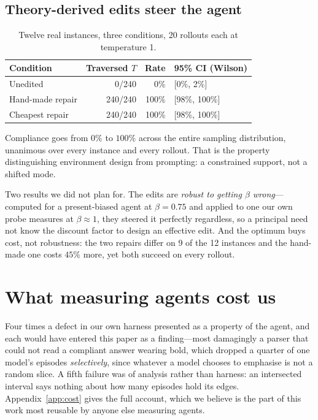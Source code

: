\documentclass[10pt]{article}
\begin{document}
\subsection{Theory-derived edits steer the agent}

\begin{table}[H]
\centering
\begin{tabular}{lrrl}
\toprule
Condition & Traversed $T$ & Rate & 95\% CI (Wilson) \\
\midrule
Unedited          & 0/240   &   0\% & [0\%, 2\%] \\
Hand-made repair  & 240/240 & 100\% & [98\%, 100\%] \\
Cheapest repair   & 240/240 & 100\% & [98\%, 100\%] \\
\bottomrule
\end{tabular}
\caption{Twelve real instances, three conditions, 20 rollouts each at temperature 1.}
\label{tab:e4}
\end{table}

Compliance goes from $0\%$ to $100\%$ across the entire sampling distribution,
unanimous over every instance and every rollout. That is the property distinguishing
environment design from prompting: a constrained support, not a shifted mode.

Two results we did not plan for. The edits are \emph{robust to getting $\beta$
wrong}---computed for a present-biased agent at $\beta = 0.75$ and applied to one our
own probe measures at $\beta \approx 1$, they steered it perfectly regardless, so a
principal need not know the discount factor to design an effective edit. And the
optimum buys cost, not robustness: the two repairs differ on 9 of the 12 instances
and the hand-made one costs $45\%$ more, yet both succeed on every rollout.

\section{What measuring agents cost us}
\label{sec:cost}

Four times a defect in our own harness presented as a property of the agent, and
each would have entered this paper as a finding---most damagingly a parser that
could not read a compliant answer wearing bold, which dropped a quarter of one
model's episodes \emph{selectively}, since whatever a model chooses to emphasise is
not a random slice. A fifth failure was of analysis rather than harness: an
intersected interval says nothing about how many episodes hold its edges.
Appendix~\ref{app:cost} gives the full account, which we believe is the part of this
work most reusable by anyone else measuring agents.
\end{document}
